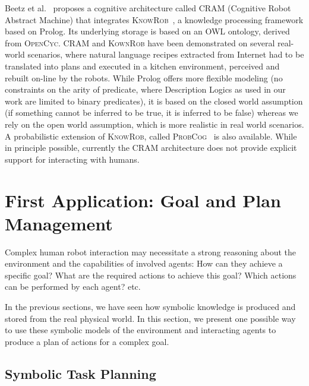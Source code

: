 \documentclass{svmult}
\begin{document}
Beetz et al.~\cite{Beetz2010} proposes a cognitive architecture called
\textsc{CRAM} (Cognitive Robot Abstract Machine) that integrates
\textsc{KnowRob}~\cite{Tenorth2009a}, a knowledge processing framework based on
Prolog. Its underlying storage is based on an OWL ontology, derived from
\textsc{OpenCyc}. \textsc{CRAM} and \textsc{KownRob} have been demonstrated on
several real-world scenarios, where natural language recipes extracted from
Internet had to be translated into plans and executed in a kitchen environment,
perceived and rebuilt on-line by the robots. While Prolog offers more flexible
modeling (no constraints on the arity of predicate, where Description Logics as
used in our work are limited to binary predicates), it is based on the closed
world assumption (if something cannot be inferred to be true, it is inferred to
be false) whereas we rely on the open world assumption, which is more realistic
in real world scenarios. A probabilistic extension of \textsc{KnowRob}, called
\textsc{ProbCog}~\cite{Jain2009} is also available. While in principle
possible, currently the CRAM architecture does not provide explicit support for
interacting with humans.


\section{First Application: Goal and Plan Management}
\label{sec|hatp}

Complex human robot interaction may necessitate a strong reasoning about
the environment and the capabilities of involved agents: How can they
achieve a specific goal? What are the required actions to achieve this
goal? Which actions can be performed by each agent? etc.

In the previous sections, we have seen how symbolic knowledge is produced
and stored from the real physical world. In this section, we present one
possible way to use these symbolic models of the environment and
interacting agents to produce a plan of actions for a complex
goal.

\subsection{Symbolic Task Planning}
\end{document}

